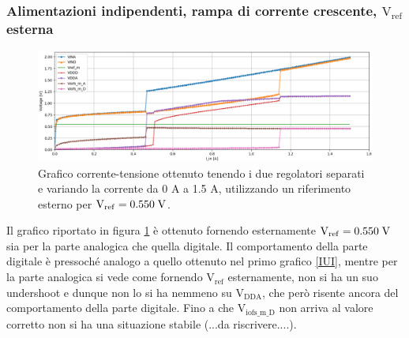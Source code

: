 \subsubsection{Alimentazioni indipendenti, rampa di corrente crescente, $\mathrm{V_{ref}}$ esterna} 
\begin{figure}
\centering
\includegraphics[width=\textwidth]{Immagini/IUEVref2}
\caption{Grafico corrente-tensione ottenuto tenendo i due regolatori separati e variando la corrente da 0 A a 1.5 A, utilizzando un riferimento esterno per $\mathrm{V_{ref}}=0.550 \rm \; V$.}
\label{IUEVref}
\end{figure}
Il grafico riportato in figura \ref{IUEVref} è ottenuto fornendo esternamente  $\mathrm{V_{ref}}=0.550 \rm \; V$  sia per la parte analogica che quella digitale. Il comportamento della parte digitale è pressoché analogo a quello ottenuto nel primo grafico \ref{IUI}, mentre per la parte analogica si vede come fornendo $\mathrm{V_{ref}}$ esternamente, non si ha un suo undershoot e dunque non lo si ha nemmeno su $\mathrm{V_{DDA}}$, che però risente ancora del comportamento della parte digitale. Fino a che $\mathrm{V_{iofs\_ m \_ D}}$ non arriva al valore corretto non si ha una situazione stabile (...da riscrivere....).

% 
%
%


